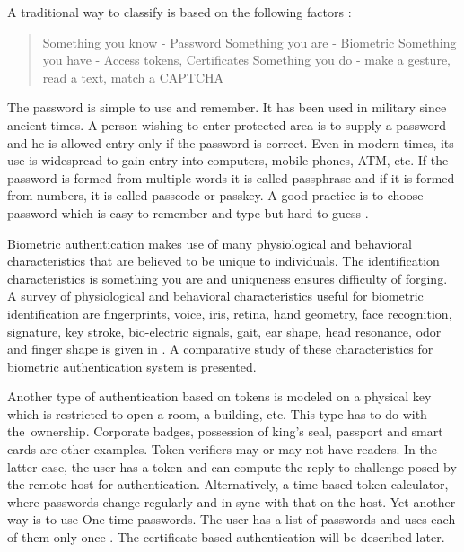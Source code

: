 \begin{multicols}{2}
\vskip -3pt

A traditional way to classify is based on the following factors \cite{chap2-key2}:
\begin{quote}
Something you know - Password
Something you are - Biometric
Something you have - Access tokens, Certificates
Something you do - make a gesture, read a text, match a CAPTCHA
\end{quote}

The password is simple to use and remember. It has been used in military since ancient times. A person wishing to enter protected area is to supply a password and he is allowed entry only if the password is correct. Even in modern times, its use is widespread to gain entry into computers, mobile phones, ATM, etc. If the password is formed from multiple words it is called passphrase and if it is formed from numbers, it is called passcode or passkey. A good practice is to choose password which is easy to remember and type but hard to guess \cite{chap2-key2}.

Biometric authentication makes use of many physiological and behavioral characteristics that are believed to be unique to individuals. The identification characteristics is something you are and uniqueness ensures difficulty of forging. A survey of physiological and behavioral characteristics useful for biometric identification are fingerprints, voice, iris, retina, hand geometry, face recognition, signature, key stroke, bio-electric signals, gait, ear shape, head resonance, odor and finger shape is given in \cite{chap2-key3}. A comparative study of these characteristics for biometric authentication system is presented. 

Another type of authentication based on tokens is modeled on a physical key which is restricted to open a room, a building, etc. This type has to do with the ownership. Corporate badges, possession of king's seal, passport and smart cards are other examples. Token verifiers may or may not have readers. In the latter case, the user has a token and can compute the reply to challenge posed by the remote host for authentication. Alternatively, a time-based token calculator, where passwords change regularly and in sync with that on the host. Yet another way is to use One-time passwords. The user has a list of passwords and uses each of them only once \cite{chap2-key2}. The certificate based authentication will be described later.


\end{multicols}
